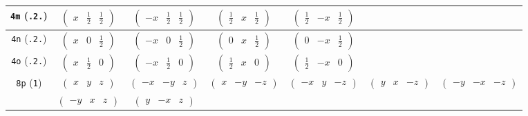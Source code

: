\documentclass[fleqn,9pt,landscape]{jsarticle}
\begin{document}
\begin{center}
\begin{longtable}{ccccccc}
{\tt 4m} ({\tt .2.}) & $ \begin{pmatrix} x & \frac{1}{2} & \frac{1}{2} \end{pmatrix} $ & $ \begin{pmatrix} - x & \frac{1}{2} & \frac{1}{2} \end{pmatrix} $ & $ \begin{pmatrix} \frac{1}{2} & x & \frac{1}{2} \end{pmatrix} $ & $ \begin{pmatrix} \frac{1}{2} & - x & \frac{1}{2} \end{pmatrix} $ & $  $ & $  $ \\ \hline
{\tt 4n} ({\tt .2.}) & $ \begin{pmatrix} x & 0 & \frac{1}{2} \end{pmatrix} $ & $ \begin{pmatrix} - x & 0 & \frac{1}{2} \end{pmatrix} $ & $ \begin{pmatrix} 0 & x & \frac{1}{2} \end{pmatrix} $ & $ \begin{pmatrix} 0 & - x & \frac{1}{2} \end{pmatrix} $ & $  $ & $  $ \\ \hline
{\tt 4o} ({\tt .2.}) & $ \begin{pmatrix} x & \frac{1}{2} & 0 \end{pmatrix} $ & $ \begin{pmatrix} - x & \frac{1}{2} & 0 \end{pmatrix} $ & $ \begin{pmatrix} \frac{1}{2} & x & 0 \end{pmatrix} $ & $ \begin{pmatrix} \frac{1}{2} & - x & 0 \end{pmatrix} $ & $  $ & $  $ \\ \hline
{\tt 8p} ({\tt 1}) & $ \begin{pmatrix} x & y & z \end{pmatrix} $ & $ \begin{pmatrix} - x & - y & z \end{pmatrix} $ & $ \begin{pmatrix} x & - y & - z \end{pmatrix} $ & $ \begin{pmatrix} - x & y & - z \end{pmatrix} $ & $ \begin{pmatrix} y & x & - z \end{pmatrix} $ & $ \begin{pmatrix} - y & - x & - z \end{pmatrix} $ \\
& $ \begin{pmatrix} - y & x & z \end{pmatrix} $ & $ \begin{pmatrix} y & - x & z \end{pmatrix} $ & $  $ & $  $ & $  $ & $  $ \\
\end{longtable}
\end{center}
\end{document}
